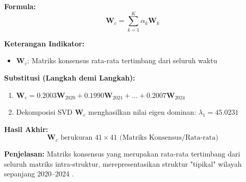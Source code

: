 \documentclass[11pt,a4paper]{article}
\begin{document}
\begin{tcolorbox}[formula_box, title={16. Matriks Kompromi ($\mathbf{W}_c$)}]
\textbf{Formula:}
\[ \mathbf{W}_c = \sum_{k=1}^{K} \alpha_k \mathbf{W}_k \]

\textbf{Keterangan Indikator:}
\begin{itemize}
  \item $\mathbf{W}_c$: Matriks konsensus rata-rata tertimbang dari seluruh waktu
\end{itemize}

\textbf{Substitusi (Langkah demi Langkah):}
\begin{enumerate}
  \item $\mathbf{W}_c = 0.2003\mathbf{W}_{2020} + 0.1990\mathbf{W}_{2021} + \dots + 0.2007\mathbf{W}_{2024}$
  \item Dekomposisi SVD $\mathbf{W}_c$ menghasilkan nilai eigen dominan: $\lambda_1 = 45.0231$
\end{enumerate}

\textbf{Hasil Akhir:}
\[ \mathbf{W}_c \text{ berukuran } 41\times41 \text{ (Matriks Konsensus/Rata-rata)} \]

\textbf{Penjelasan:} Matriks konsensus yang merupakan rata-rata tertimbang dari seluruh matriks intra-struktur, merepresentasikan struktur "tipikal" wilayah sepanjang 2020--2024 \citet{lavit94}.
\end{tcolorbox}
\end{document}
